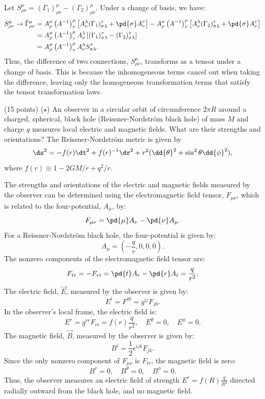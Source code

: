 \begin{solution}[(ii)]
  Let $S_{\rho\nu}^\mu = (\Gamma_1)_{\rho\nu}^\mu - (\Gamma_2)_{\rho\nu}^\mu$. Under a change of basis, we have:
  \begin{align*}
    S_{\rho\nu}^\mu \to \G_{\rho\nu}^\mu &= A_\rho^\sigma \left(A^{-1}\right)_\tau^\mu \left[A_\nu^\lambda (\Gamma_1)_{\sigma\lambda}^\tau + \pd{\sigma}A_\nu^\tau\right] - A_\rho^\sigma \left(A^{-1}\right)_\tau^\mu \left[A_\nu^\lambda (\Gamma_2)_{\sigma\lambda}^\tau + \pd{\sigma}A_\nu^\tau\right] \\
                                         &= A_\rho^\sigma \left(A^{-1}\right)_\tau^\mu A_\nu^\lambda \left[(\Gamma_1)_{\sigma\lambda}^\tau - (\Gamma_2)_{\sigma\lambda}^\tau\right] \\
                                         &= A_\rho^\sigma \left(A^{-1}\right)_\tau^\mu A_\nu^\lambda S_{\sigma\lambda}^\tau
  .\end{align*}
  Thus, the difference of two connections, $S_{\rho\nu}^\mu$, transforms as a tensor under a change of basis. This is because the inhomogeneous terms cancel out when taking the difference, leaving only the homogeneous transformation terms that satisfy the tensor transformation laws.
\end{solution}

\begin{problem}[3]
  (15 points) ($\star$) An observer in a circular orbit of circumference $2\pi R$ around a charged, spherical, black hole (Reissner-Nordstr\"om black hole) of mass $M$ and charge $q$ measures local electric and magnetic fields. What are their strengths and orientations? The Reissner-Nordstr\"om metric is given by
  \[%
    \ds^2 = -f(r)\dt^2 + f(r)^{-1}\dr^2 + r^2(\dd{\theta}^2 + \sin^2\theta \dd{\phi}^2)
  ,\]%
  where $f(r) \equiv 1 - 2GM/r + q^2/r$.
\end{problem}

\begin{solution}
  The strengths and orientations of the electric and magnetic fields measured by the observer can be determined using the electromagnetic field tensor, $F_{\mu\nu}$, which is related to the four-potential, $A_\mu$, by:
  \[%
    F_{\mu\nu} = \pd{\mu} A_\nu - \pd{\nu} A_\mu
  .\]%
  For a Reissner-Nordstr\"om black hole, the four-potential is given by:
  \[%
    A_\mu = \left(-\frac{q}{r}, 0, 0, 0\right)
  .\]%
  The nonzero components of the electromagnetic field tensor are:
  \[%
    F_{tr} = -F_{rt} = \pd{t} A_r - \pd{r} A_t = \frac{q}{r^2}
  .\]%
  The electric field, $\vec{E}$, measured by the observer is given by:
  \[%
    E^i = F^{i0} = g^{ij} F_{j0}
  .\]%
  In the observer's local frame, the electric field is:
  \[%
    E^r = g^{rr} F_{rt} = f(r) \frac{q}{r^2}, \quad E^\theta = 0, \quad E^\phi = 0
  .\]%
  The magnetic field, $\vec{B}$, measured by the observer is given by:
  \[%
    B^i = \frac{1}{2} \epsilon^{ijk} F_{jk}
  .\]%
  Since the only nonzero component of $F_{\mu\nu}$ is $F_{tr}$, the magnetic field is zero:
  \[%
    B^r = 0, \quad B^\theta = 0, \quad B^\phi = 0
  .\]%
  Thus, the observer measures an electric field of strength $E^r = f(R) \frac{q}{R^2}$ directed radially outward from the black hole, and no magnetic field.
\end{solution}
